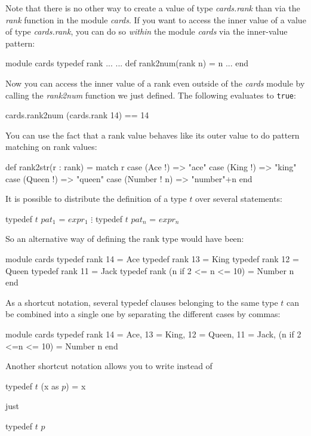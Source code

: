 \documentclass[11pt]{amsart}
\newcommand{\babelsrc}[1] {\lstinline!#1!}
\begin{document}
Note that there is no other way to create a value of type \emph{cards.rank} than via the \emph{rank} function in the module \emph{cards}.  If you want to access the inner value of a value of type \emph{cards.rank}, you can do so \emph{within} the module \emph{cards} via the inner-value pattern:
\begin{babellisting}
module cards
  typedef rank ...
  ...
  def rank2num(rank n) = n
  ...
end
\end{babellisting}
Now you can access the inner value of a rank even outside of the \emph{cards} module by calling the \emph{rank2num} function we just defined. The following evaluates to \babelsrc{true}:
\begin{babellisting}
cards.rank2num (cards.rank 14) == 14
\end{babellisting}
You can use the fact that a rank value behaves like its outer value to do pattern matching on rank values:
\begin{babellisting}
def rank2str(r : rank) = 
  match r
    case (Ace !) => "ace"
    case (King !) => "king"
    case (Queen !) => "queen"
    case (Number ! n) => "number"+n
  end
\end{babellisting}
It is possible to distribute the definition of a type $t$ over several statements:
\begin{babellisting}
typedef $t$ $pat_1$ = $expr_1$
  $\vdots$
typedef $t$ $pat_n$ = $expr_n$
\end{babellisting}
So an alternative way of defining the rank type would have been:
\begin{babellisting}
module cards
  typedef rank 14 = Ace
  typedef rank 13 = King
  typedef rank 12 = Queen
  typedef rank 11 = Jack
  typedef rank (n if 2 <= n <= 10) = Number n
end
\end{babellisting}
As a shortcut notation, several typedef clauses belonging to the same type $t$ can be combined into a single one by separating the different cases by commas:
\begin{babellisting}
module cards
  typedef rank 14 = Ace, 13 = King, 12 = Queen, 11 = Jack, 
                (n if 2 <=n <= 10) = Number n
end
\end{babellisting}
Another shortcut notation allows you to write instead of
\begin{babellisting}
typedef $t$ (x as $p$) = x
\end{babellisting}
just 
\begin{babellisting}
typedef $t$ $p$
\end{babellisting}
\end{document}
